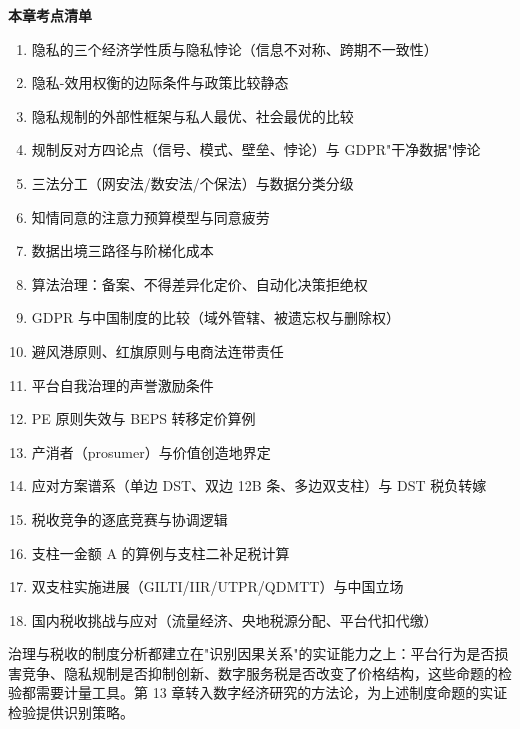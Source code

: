\begin{chapterbox}
\textbf{本章考点清单}

\begin{enumerate}
\item 隐私的三个经济学性质与隐私悖论（信息不对称、跨期不一致性）
\item 隐私-效用权衡的边际条件与政策比较静态 
\item 隐私规制的外部性框架与私人最优、社会最优的比较 
\item 规制反对方四论点（信号、模式、壁垒、悖论）与 GDPR"干净数据"悖论 
\item 三法分工（网安法/数安法/个保法）与数据分类分级 
\item 知情同意的注意力预算模型与同意疲劳 
\item 数据出境三路径与阶梯化成本 
\item 算法治理：备案、不得差异化定价、自动化决策拒绝权 
\item GDPR 与中国制度的比较（域外管辖、被遗忘权与删除权）
\item 避风港原则、红旗原则与电商法连带责任 
\item 平台自我治理的声誉激励条件 
\item PE 原则失效与 BEPS 转移定价算例 
\item 产消者（prosumer）与价值创造地界定 
\item 应对方案谱系（单边 DST、双边 12B 条、多边双支柱）与 DST 税负转嫁 
\item 税收竞争的逐底竞赛与协调逻辑 
\item 支柱一金额 A 的算例与支柱二补足税计算 
\item 双支柱实施进展（GILTI/IIR/UTPR/QDMTT）与中国立场 
\item 国内税收挑战与应对（流量经济、央地税源分配、平台代扣代缴）
\end{enumerate}
\end{chapterbox}

治理与税收的制度分析都建立在"识别因果关系"的实证能力之上：平台行为是否损害竞争、隐私规制是否抑制创新、数字服务税是否改变了价格结构，这些命题的检验都需要计量工具。第 13 章转入数字经济研究的方法论，为上述制度命题的实证检验提供识别策略。
